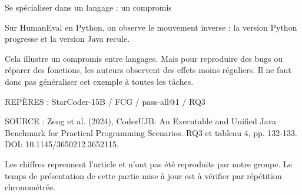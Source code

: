 \documentclass[aspectratio=169,usepdftitle=false]{beamer}
\begin{document}
\begin{frame}{Se spécialiser dans un langage : un compromis}
{Sur HumanEval en Python, on observe le mouvement inverse : la version Python progresse et la version Java recule.

Cela illustre un compromis entre langages. Mais pour reproduire des bugs ou réparer des fonctions, les auteurs observent des effets moins réguliers. Il ne faut donc pas généraliser cet exemple à toutes les tâches.

REPÈRES : StarCoder-15B / FCG / pass-all@1 / RQ3

SOURCE : Zeng et al. (2024), CoderUJB: An Executable and Unified Java Benchmark for Practical Programming Scenarios. RQ3 et tableau 4, pp. 132-133. DOI: 10.1145/3650212.3652115.

Les chiffres reprennent l'article et n'ont pas été reproduits par notre groupe. Le temps de présentation de cette partie mise à jour est à vérifier par répétition chronométrée.
}
\end{frame}

\end{document}
